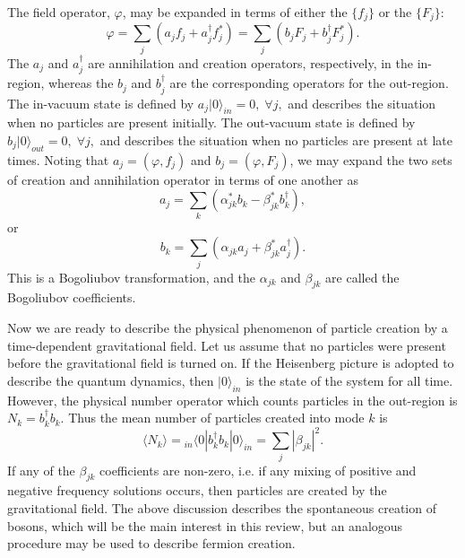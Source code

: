 \documentclass[12pt,onecolumn,eqsecnum,floats,aps,prd,floatfix,titlepage]{revtex4-2}
\begin{document}
The field operator, $\varphi$, may be expanded in terms of either the
$\{ f_j \}$ or the $\{ F_j \}$:
\begin{equation}
  \varphi = \sum\limits_j (a_j f_j + a_j^\dagger f_j^*)
  =\sum\limits_j (b_j F_j + b_j^\dagger F_j^*).
\end{equation}
The $a_j$ and $a_j^\dagger$ are annihilation and creation operators,
respectively, in the in-region, whereas the $b_j$ and $b_j^\dagger$
are the corresponding operators for the out-region. The in-vacuum state
is defined by $a_j|0\rangle_{in}=0, \; \forall j,$ and describes the
situation when no particles are present initially. The out-vacuum state
is defined by $b_j|0\rangle_{out}=0, \; \forall j,$ and describes the
situation when no particles are present at late times. Noting that
$a_j = (\varphi,f_j)$ and $b_j = (\varphi,F_j)$, we may expand the
two sets of creation and annihilation operator in terms of one another
as 
\begin{equation}
a_j=\sum\limits_k (\alpha _{jk}^*b_k-\beta _{jk}^* b_k^\dagger),
                                      \label{eq:Bogo1}
\end{equation}
or 
\begin{equation}
b_k=\sum\limits_j (\alpha _{jk} a_j + \beta _{jk}^* a _j^\dagger).
                                       \label{eq:Bogo2}
\end{equation}
This is a Bogoliubov transformation, and the $\alpha_{jk}$ and
$\beta_{jk}$ are called the Bogoliubov coefficients.

   Now we are ready to describe the physical phenomenon of particle
creation by a time-dependent gravitational field. Let us assume that
no particles were present before the gravitational field is turned on.
If the Heisenberg picture is adopted to describe the quantum dynamics,
then $|0\rangle_{in}$ is the state of the system for all time. However,
the physical number operator which counts particles in the out-region
is $N_k = b_k^\dagger b_k$. Thus the mean number of particles created
into mode $k$ is 
\begin{equation}
\langle N_k \rangle = {}_{in}\langle 0|b_k^\dagger b_k |0\rangle_{in}
       = \sum\limits_j |{\beta _{jk}}|^2.
 \label{eq:N}      
\end{equation}
If any of the $\beta_{jk}$ coefficients are non-zero, i.e. if
any mixing of positive and negative frequency solutions occurs, then
particles are created by the gravitational field.  The above discussion describes the 
spontaneous creation of bosons, which will be the main interest in this review,
but an analogous procedure may be used to describe fermion creation.
 
\end{document}
